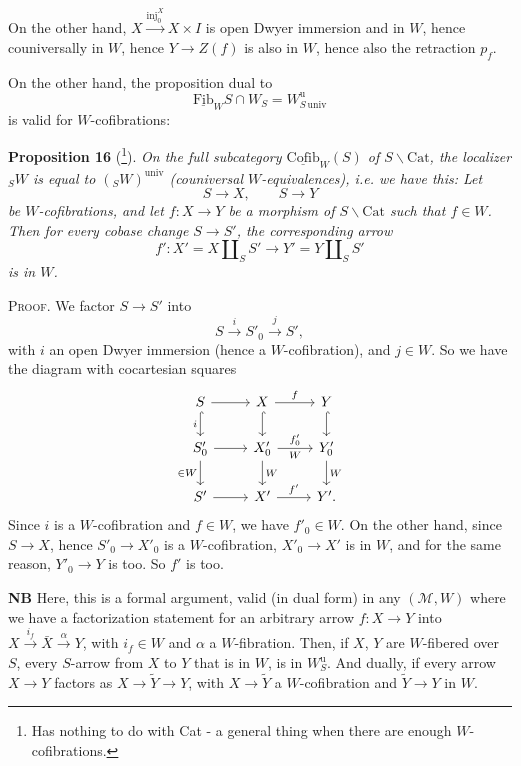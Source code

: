 \documentclass[11pt]{article}
\newcommand{\printedpage}[1]{\marginpar{\footnotesize p.~#1}}
\newcommand{\msp}[1]{\marginpar{\footnotesize [#1]}}
\begin{document}
On the other hand, $X \xrightarrow{\mathrm{inj}_0^X} X \times I$ is open Dwyer immersion and in $W$, hence couniversally in $W$, hence $Y \longrightarrow Z(f)$ is also in $W$, hence also the retraction $p_f$.

On the other hand, the proposition dual to
\[
\underline{\mathrm{Fib}}_W S \cap W_S = W^{\mathrm{u}}_{S\,\mathrm{univ}}
\]
is valid for $W$-cofibrations:

\msp{page 231}
\textbf{Proposition 16} (\footnote[125]{Has nothing to do with Cat - a general thing when there are enough $W$-cofibrations.}). \textit{On the full subcategory $\underline{\mathrm{Cofib}}_W(S)$ of $S\backslash\mathrm{Cat}$, the localizer ${}_SW$ is equal to $({}_SW)^{\mathrm{univ}}$ (couniversal $W$-equivalences), i.e. we have this: Let}
\[
S \longrightarrow X, \qquad S \longrightarrow Y
\]
\textit{be $W$-cofibrations, and let $f : X \longrightarrow Y$ be a morphism of $S\backslash\mathrm{Cat}$ such that $f \in W$. Then for every cobase change $S \longrightarrow S'$, the corresponding arrow}
\[
f' : X' = X \amalg_S S' \longrightarrow Y' = Y \amalg_S S'
\]
\textit{is in $W$.}

\textsc{Proof}. We factor $S \longrightarrow S'$ into
\[
S \xrightarrow{i} S'_0 \xrightarrow{j} S',
\]
with $i$ an open Dwyer immersion (hence a $W$-cofibration), and $j \in W$. So we have the diagram with cocartesian squares
\[
\begin{tikzcd}
S \arrow[r] \arrow[d, hook, "i"'] & X \arrow[r, "f"] \arrow[d, hook] & Y \arrow[d, hook] \\
S'_0 \arrow[r] \arrow[d, "\in W"'] & X'_0 \arrow[r, "f'_0", "W"'] \arrow[d, "W"] & Y'_0 \arrow[d, "W"] \\
S' \arrow[r] & X' \arrow[r, "f'"] & Y'.
\end{tikzcd}
\]
Since $i$ is a $W$-cofibration and $f \in W$, we have $f'_0 \in W$. On the other hand, since $S \longrightarrow X$, hence $S'_0 \longrightarrow X'_0$ is
\printedpage{148}
\msp{page 232}
a $W$-cofibration, $X'_0 \longrightarrow X'$ is in $W$, and for the same reason, $Y'_0 \longrightarrow Y$ is too. So $f'$ is too. %

\textbf{NB} Here, this is a formal argument, valid (in dual form) in any $(\mathcal{M}, W)$ where we have a factorization statement for an arbitrary arrow $f : X \longrightarrow Y$ into $X \xrightarrow{i_f} \bar{X} \xrightarrow{\alpha} Y$, with $i_f \in W$ and $\alpha$ a $W$-fibration. Then, if $X$, $Y$ are $W$-fibered over $S$, every $S$-arrow from $X$ to $Y$ that is in $W$, is in $W^{\mathrm{u}}_S$. And dually, if every arrow $X \longrightarrow Y$ factors as $X \longrightarrow \tilde{Y} \longrightarrow Y$, with $X \longrightarrow \tilde{Y}$ a $W$-cofibration and $\tilde{Y} \longrightarrow Y$ in $W$.
\end{document}
